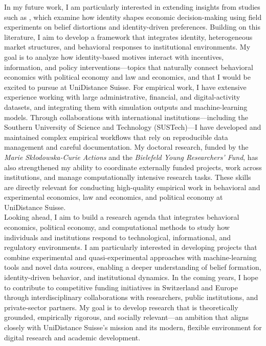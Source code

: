 \documentclass{nfr}
\begin{document}
In my future work, I am particularly interested in extending insights from studies such as \citet{donkor2025price}, which examine how identity shapes economic decision-making using field experiments on belief distortions and identity-driven preferences. 
Building on this literature, I aim to develop a framework that integrates identity, heterogeneous market structures, and behavioral responses to institutional environments. 
My goal is to analyze how identity-based motives interact with incentives, information, and policy interventions—topics that naturally connect behavioral economics with political economy and law and economics, and that I would be excited to pursue at UniDistance Suisse.
For empirical work, I have extensive experience working with large administrative, financial, and digital-activity datasets, and integrating them with simulation outputs and machine-learning models. 
Through collaborations with international institutions—including the Southern University of Science and Technology (SUSTech)—I have developed and maintained complex empirical workflows that rely on reproducible data management and careful documentation. 
My doctoral research, funded by the \textit{Marie Skłodowska-Curie Actions} and the \textit{Bielefeld Young Researchers’ Fund}, has also strengthened my ability to coordinate externally funded projects, work across institutions, and manage computationally intensive research tasks. 
These skills are directly relevant for conducting high-quality empirical work in behavioral and experimental economics, law and economics, and political economy at UniDistance Suisse.\\

Looking ahead, I aim to build a research agenda that integrates behavioral economics, political economy, and computational methods to study how individuals and institutions respond to technological, informational, and regulatory environments. 
I am particularly interested in developing projects that combine experimental and quasi-experimental approaches with machine-learning tools and novel data sources, enabling a deeper understanding of belief formation, identity-driven behavior, and institutional dynamics. 
In the coming years, I hope to contribute to competitive funding initiatives in Switzerland and Europe through interdisciplinary collaborations with researchers, public institutions, and private-sector partners. 
My goal is to develop research that is theoretically grounded, empirically rigorous, and socially relevant—an ambition that aligns closely with UniDistance Suisse’s mission and its modern, flexible environment for digital research and academic development.\\
\end{document}
